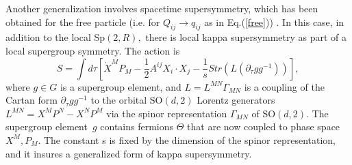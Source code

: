 \documentclass[a4paper,12pt]{article}
\begin{document}
Another generalization involves spacetime supersymmetry, which has
been obtained for the free particle (i.e. for $Q_{ij}\rightarrow
q_{ij}$ as in Eq.(\ref{free})) \cite{super2t}\cite{survey2T}. In
this case, in addition to the local Sp$\left( 2,R\right) ,$ there
is local kappa supersymmetry as part of a local supergroup
symmetry. The action is
\begin{equation}
S=\int d\tau \left[ \dot{X}^{M}P_{M}-\frac{1}{2}A^{ij} X_{i}\cdot
X_{j} -\frac{1}{s}Str\left( L\left( \partial _{\tau
}gg^{-1}\right) \right) \right] ,  \label{Lsuper}
\end{equation}
where $g\in G$ is a supergroup element, and $L=L^{MN}\Gamma _{MN}$
is a coupling of the Cartan form $\partial _{\tau }gg^{-1}$ to the
orbital SO$ \left( d,2\right) $ Lorentz generators
$L^{MN}=X^{M}P^{N}-X^{N}P^{M}$ via the spinor representation
$\Gamma _{MN}$ of SO$\left( d,2\right) .$ The supergroup element\
$g$ contains fermions $\Theta $ that are now coupled to phase
space $X^{M},P_{M}$. The constant s is fixed by the dimension of
the spinor representation, and it insures a generalized form of
kappa supersymmetry.
\end{document}
